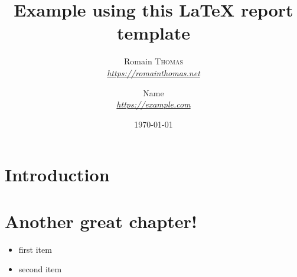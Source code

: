 \documentclass{my-report}
\title{Example using this {\LaTeX} report template}
\author{
Romain \textsc{Thomas} \\
\textit{\url{https://romainthomas.net}}
\and
Name \\
\textit{\url{https://example.com}}
}
\date{\today}
\begin{document}
\maketitle

\chapter{Introduction}

\lipsum[1-10]

\chapter{Another great chapter!}

\begin{itemize}
  \item first item
  \item second item
\end{itemize}

\lipsum[1-3]

 
\end{document}
